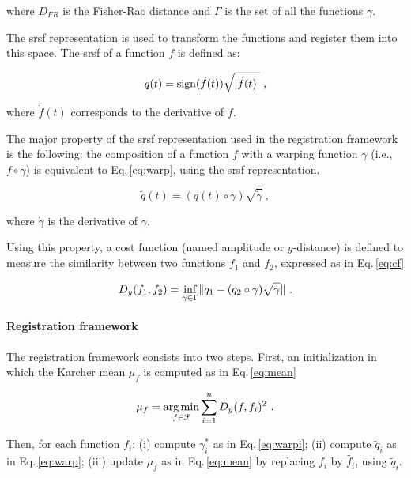 \noindent where $D_{FR}$ is the Fisher-Rao distance and $\Gamma$ is the set of all the functions $\gamma$.

The \Ac{srsf} representation is used to transform the functions and register them into this space.
The \ac{srsf} of a function $f$ is defined as:

\begin{equation}
  q(t) = \operatorname*{sign}(\dot{f}(t))\sqrt{|\dot{f}(t)|} \ ,
  \label{eq:srsf}
\end{equation}

\noindent where $\dot{f}(t)$ corresponds to the derivative of $f$.

The major property of the \ac{srsf} representation used in the registration framework is the following: the composition of a function $f$ with a warping function $\gamma$ (i.e., $f \circ \gamma$) is equivalent to Eq.\,\eqref{eq:warp}, using the \ac{srsf} representation.

\begin{equation}
  \tilde{q}(t) = (q(t) \circ \gamma) \sqrt{\dot{\gamma}} \ ,
  \label{eq:warp}
\end{equation}

\noindent where $\dot{\gamma}$ is the derivative of $\gamma$.

Using this property, a cost function (named amplitude or $y$-distance) is defined to measure the similarity between two functions $f_1$ and $f_2$, expressed as in Eq.\,\eqref{eq:cf}

\begin{equation}
  D_y(f_1, f_2) = \underset{\gamma \in \Gamma}{\operatorname*{inf}} \| q_1 - (q_2 \circ \gamma) \sqrt{\dot{\gamma}} \| \ .
  \label{eq:cf}
\end{equation}

\paragraph{Registration framework}\label{par:chp5:T2-norm:regfra}

The registration framework consists into two steps. First, an initialization in which the Karcher mean $\mu_f$ is computed as in Eq.\,\eqref{eq:mean}

\begin{equation}
  \mu_f = \operatorname*{arg\,min}_{f \in \mathcal{F}} \sum_{i = 1}^{n} D_y(f, f_i)^2 \ .
  \label{eq:mean}
\end{equation}

Then, for each function $f_i$: 
(i) compute $\gamma_{i}^{*}$ as in Eq.\,\eqref{eq:warpi}; 
(ii) compute $\tilde{q}_i$ as in Eq.\,\eqref{eq:warp};
(iii) update $\mu_f$ as in Eq.\,\eqref{eq:mean} by replacing $f_i$ by $\tilde{f_i}$, using $\tilde{q}_i$.

